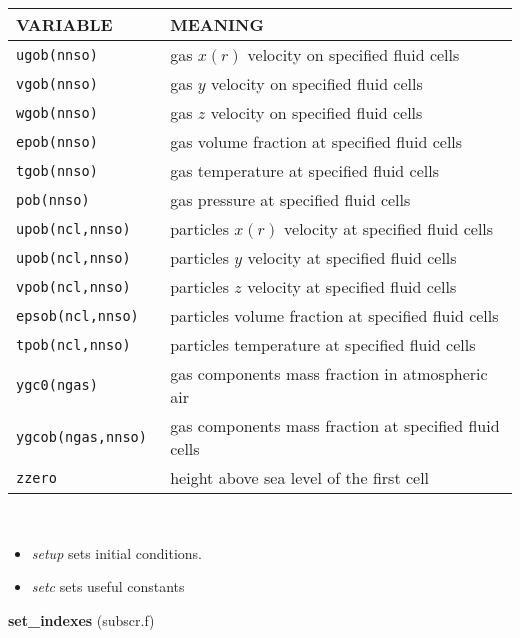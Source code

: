 \begin{tabular}{|p{6cm}|p{6cm}|}\hline
VARIABLE & MEANING\\\hline
\tt ugob(nnso) & gas $x(r)$ velocity on specified fluid cells\\\hline 
\tt vgob(nnso) & gas $y$ velocity on specified fluid cells\\\hline
\tt wgob(nnso) & gas $z$ velocity on specified fluid cells\\\hline
\tt epob(nnso) & gas volume fraction at specified fluid cells\\\hline
\tt  tgob(nnso) & gas temperature at specified fluid cells\\\hline
\tt pob(nnso) & gas pressure at specified fluid cells\\\hline
\tt upob(ncl,nnso) & particles $x(r)$ velocity at specified fluid cells\\\hline
\tt upob(ncl,nnso) & particles $y$ velocity at specified fluid cells\\\hline
\tt vpob(ncl,nnso) & particles $z$ velocity at specified fluid cells\\\hline
\tt epsob(ncl,nnso) & particles volume fraction at specified fluid cells\\\hline
\tt tpob(ncl,nnso) & particles temperature at specified fluid cells\\\hline
\tt ygc0(ngas) & gas components mass fraction in atmospheric air\\\hline
\tt ygcob(ngas,nnso) & gas components mass fraction at specified fluid cells\\\hline
\tt zzero & height above sea level of the first cell\\\hline
\end{tabular}\\
\begin{itemize}
\item {\em setup} sets initial conditions.
\item {\em setc} sets useful constants
\end{itemize}
%
%
{\large{\bf set\_indexes}} (subscr.f)\\[5mm]
